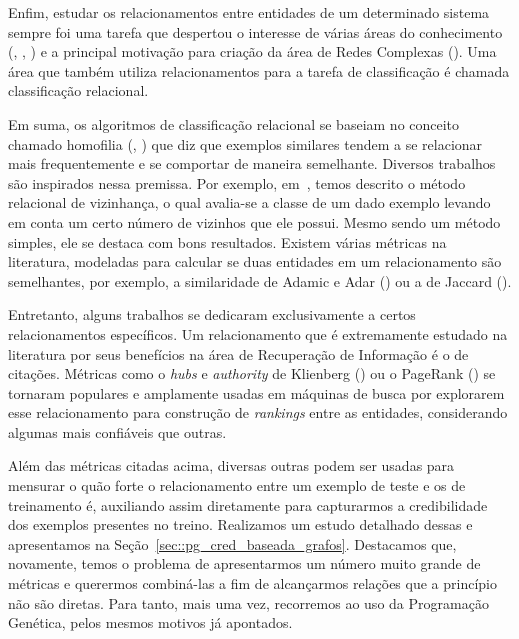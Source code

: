 Enfim, estudar os relacionamentos entre entidades de um determinado sistema sempre foi uma tarefa que despertou o interesse de várias áreas do conhecimento (\cite{Onody04}, \cite{Shen05}, \cite{Rubinov10}) e a principal motivação para criação da área de Redes Complexas (\cite{Newman03}).
Uma área que também utiliza relacionamentos para a tarefa de classificação é chamada classificação relacional. %

Em suma, os algoritmos de classificação relacional se baseiam no conceito chamado homofilia (\cite{Blau77}, \cite{Mcpherson01}) que diz que exemplos similares tendem a se relacionar mais frequentemente e se comportar de maneira semelhante.
Diversos trabalhos são inspirados nessa premissa. Por exemplo, em~\cite{Macskassy04}, temos descrito o método relacional de vizinhança, o qual avalia-se
a classe de um dado exemplo levando em conta um certo número de vizinhos que ele possui. Mesmo sendo um método simples, ele se destaca com bons resultados.
Existem várias métricas na literatura, modeladas para calcular se duas entidades em um relacionamento são semelhantes, por exemplo, a similaridade de Adamic e Adar (\cite{Adamic03}) ou a de Jaccard (\cite{Jaccard01}).

Entretanto, alguns trabalhos se dedicaram exclusivamente a certos relacionamentos específicos.
Um relacionamento que é extremamente estudado na literatura por seus benefícios na área de Recuperação de Informação é o de citações.
Métricas como o \textit{hubs} e \textit{authority} de Klienberg (\cite{Kleinberg99}) ou o PageRank (\cite{Page98}) se tornaram populares e amplamente usadas em máquinas de busca por explorarem esse relacionamento para construção de \textit{rankings} entre as entidades, considerando algumas mais confiáveis que outras.

Além das métricas citadas acima, diversas outras podem ser usadas para mensurar o quão forte o relacionamento entre um exemplo de teste e os de treinamento é, auxiliando assim diretamente para capturarmos a credibilidade dos exemplos presentes no treino. Realizamos um estudo detalhado dessas e apresentamos na Seção~\ref{sec::pg_cred_baseada_grafos}.
Destacamos que, novamente, temos o problema de apresentarmos um número muito grande de métricas e querermos combiná-las a fim de alcançarmos relações que a princípio não são diretas.
Para tanto, mais uma vez, recorremos ao uso da Programação Genética, pelos mesmos motivos já apontados.

